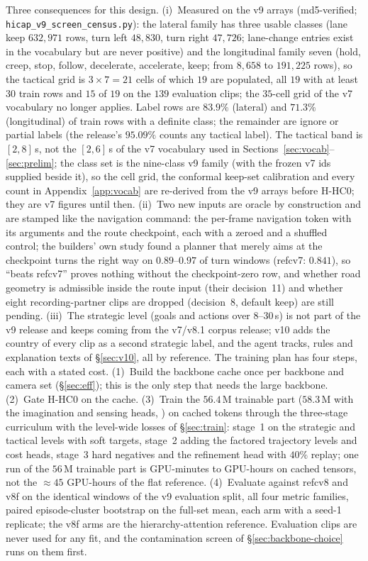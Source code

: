 Three consequences for this design. (i)~Measured on the v9 arrays (md5-verified; \texttt{hicap\_v9\_screen\_census.py})\evM: the lateral family has three usable classes (lane keep $632{,}971$ rows, turn left $48{,}830$, turn right $47{,}726$; lane-change entries exist in the vocabulary but are never positive) and the longitudinal family seven (hold, creep, stop, follow, decelerate, accelerate, keep; from $8{,}658$ to $191{,}225$ rows), so the tactical grid is $3\times7=21$ cells of which $19$ are populated, all $19$ with at least $30$ train rows and $15$ of $19$ on the $139$ evaluation clips; the $35$-cell grid of the v7 vocabulary no longer applies. Label rows are $83.9\%$ (lateral) and $71.3\%$ (longitudinal) of train rows with a definite class; the remainder are ignore or partial labels (the release's $95.09\%$ counts any tactical label). The tactical band is $[2,8]$\,s, not the $[2,6]$\,s of the v7 vocabulary used in Sections~\ref{sec:vocab}--\ref{sec:prelim}; the class set is the nine-class v9 family (with the frozen v7 ids supplied beside it), so the cell grid, the conformal keep-set calibration and every count in Appendix~\ref{app:vocab} are re-derived from the v9 arrays before H-HC0; they are v7 figures until then. (ii)~Two new inputs are oracle by construction and are stamped like the navigation command: the per-frame navigation token with its arguments and the route checkpoint, each with a zeroed and a shuffled control; the builders' own study found a planner that merely aims at the checkpoint turns the right way on $0.89$--$0.97$ of turn windows (refcv7: $0.841$), so ``beats refcv7'' proves nothing without the checkpoint-zero row, and whether road geometry is admissible inside the route input (their decision~11) and whether eight recording-partner clips are dropped (decision~8, default keep) are still pending. (iii)~The strategic level (goals and actions over $8$--$30$\,s) is not part of the v9 release and keeps coming from the v7/v8.1 corpus release; v10 adds the country of every clip as a second strategic label, and the agent tracks, rules and explanation texts of \S\ref{sec:v10}, all by reference.
The training plan has four steps, each with a stated cost. (1)~Build the backbone cache once per backbone and camera set (\S\ref{sec:eff}); this is the only step that needs the large backbone. (2)~Gate H-HC0 on the cache. (3)~Train the $56.4$\,M trainable part ($58.3$\,M with the imagination and sensing heads, \evM) on cached tokens through the three-stage curriculum with the level-wide losses of \S\ref{sec:train}: stage~1 on the strategic and tactical levels with soft targets, stage~2 adding the factored trajectory levels and cost heads, stage~3 hard negatives and the refinement head with $40\%$ replay; one run of the $56$\,M trainable part is GPU-minutes to GPU-hours on cached tensors, not the $\approx45$ GPU-hours of the flat reference. (4)~Evaluate against refcv8 and v8f on the identical windows of the v9 evaluation split, all four metric families, paired episode-cluster bootstrap on the full-set mean, each arm with a seed-1 replicate; the v8f arms are the hierarchy-attention reference. Evaluation clips are never used for any fit, and the contamination screen of \S\ref{sec:backbone-choice} runs on them first.
